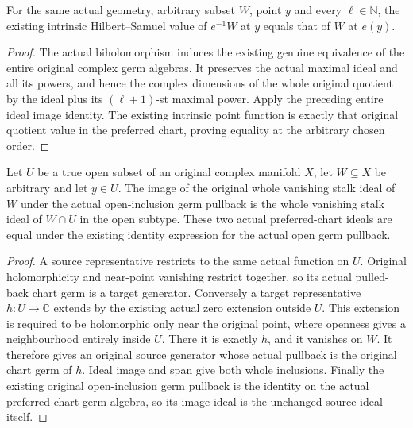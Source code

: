 \begin{theorem}
\label{hir:actual-any-subset-biholomorphic-intrinsic-hs}
\leanok
For the same actual geometry, arbitrary subset $W$, point $y$ and every
$\ell\in\mathbb N$, the existing intrinsic Hilbert--Samuel value of
$e^{-1}W$ at $y$ equals that of $W$ at $e(y)$.
\end{theorem}
\begin{proof}
The actual biholomorphism induces the existing genuine equivalence of
the entire original complex germ algebras. It preserves the actual
maximal ideal and all its powers, and hence the complex dimensions of
the whole original quotient by the ideal plus its $(\ell+1)$-st maximal
power. Apply the preceding entire ideal image identity. The existing
intrinsic point function is exactly that original quotient value in the
preferred chart, proving equality at the arbitrary chosen order.
\end{proof}

\begin{theorem}
\label{hir:actual-any-subset-open-whole-vanishing-ideal}
\leanok
Let $U$ be a true open subset of an original complex manifold $X$, let
$W\subseteq X$ be arbitrary and let $y\in U$. The image of the original
whole vanishing stalk ideal of $W$ under the actual open-inclusion germ
pullback is the whole vanishing stalk ideal of $W\cap U$ in the open
subtype. These two actual preferred-chart ideals are equal under the
existing identity expression for the actual open germ pullback.
\end{theorem}
\begin{proof}
A source representative restricts to the same actual function on $U$.
Original holomorphicity and near-point vanishing restrict together, so
its actual pulled-back chart germ is a target generator. Conversely a
target representative $h:U\to\mathbb C$ extends by the existing actual
zero extension outside $U$. This extension is required to be holomorphic
only near the original point, where openness gives a neighbourhood
entirely inside $U$. There it is exactly $h$, and it vanishes on $W$.
It therefore gives an original source generator whose actual pullback
is the original chart germ of $h$. Ideal image and span give both whole
inclusions. Finally the existing original open-inclusion germ pullback
is the identity on the actual preferred-chart germ algebra, so its image
ideal is the unchanged source ideal itself.
\end{proof}


